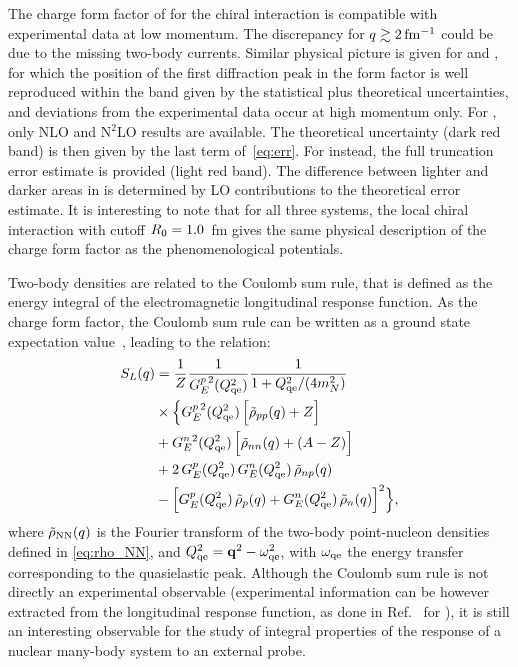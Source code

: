 \documentclass[aps,prc,twocolumn,superscriptaddress,showpacs,floatfix,nofootinbib]{revtex4-1}
\begin{document}
The charge form factor of  for the chiral interaction is compatible
with experimental data at low momentum. The discrepancy for $q\gtrsim2\,\rm fm^{-1}$ could be
due to the missing two-body currents. Similar physical picture is given for  and
, for which the position of the first diffraction peak in the form factor 
is well reproduced within the band given by the statistical plus theoretical uncertainties, 
and deviations from the experimental data occur at high momentum only.
For , only NLO and N$^2$LO results are available. The theoretical 
uncertainty (dark red band) is then given by the last term of~\cref{eq:err}.
For  instead, the full truncation error estimate is provided
(light red band). The difference between lighter and darker areas in 
is determined by LO contributions to the theoretical error estimate.
It is interesting to note that for all three systems, the local chiral interaction with 
cutoff $R_0=1.0\,\rm$ fm gives the same physical description of the charge form factor as 
the phenomenological potentials.

Two-body densities are related to the Coulomb sum rule, that is defined as the energy integral 
of the electromagnetic longitudinal response function. As the charge form factor, the Coulomb sum rule
can be written as a ground state expectation value~\cite{Mcvoy:1962}, leading to the relation:
\begin{align}
	S_L(q)&=\frac{1}{Z} \frac{1}{G_E^{p\,2}(Q_{\rm qe}^2)}\frac{1}{1+Q_{\rm qe}^2/(4 m_N^2)} \nonumber \\
    & \times\Big\{ G_E^{p\,2}(Q_{\rm qe}^2)\,\Big[\tilde{\rho}_{pp}(q)+Z\Big] \nonumber \\
    &        +G_E^{n\,2}(Q_{\rm qe}^2)\,\Big[\tilde{\rho}_{nn}(q)+(A-Z)\Big] \nonumber \\
    &        +2\,G_E^p(Q_{\rm qe}^2)\,G_E^n(Q_{\rm qe}^2)\,\tilde{\rho}_{np}(q) \nonumber \\ 
    & -\Big[G_E^p(Q_{\rm qe}^2)\,\tilde{\rho}_p(q)+G_E^n(Q_{\rm qe}^2)\,\tilde{\rho}_n(q)\Big]^2 \Big\}, 
	\label{eq:sl}
\end{align}
where $\tilde{\rho}_{\rm{NN}}(q)$ is the Fourier transform of the two-body point-nucleon densities defined in \cref{eq:rho_NN},
and $Q^2_{\rm qe}=\vb{q}^2-\omega^2_{\rm qe}$, with $\omega_{\rm qe}$ the energy transfer 
corresponding to the quasielastic peak.
Although the Coulomb sum rule is not directly an experimental observable (experimental information can be however
extracted from the longitudinal response function, as done in Ref.~\cite{Lovato:2016} for ), it is
still an interesting observable for the study of integral properties of the response of a nuclear many-body system to an
external probe.
\end{document}
